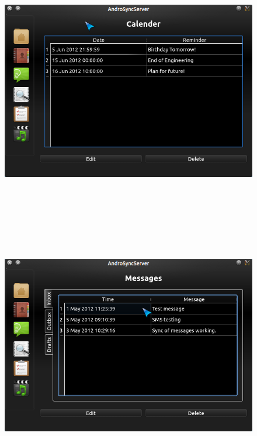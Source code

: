 \vspace{1cm}
\begin{figure}[H]
  \centering
    \includegraphics[height= 11cm, width=17cm]{project/images/AndroSyncServer/AndroSyncServer_Calender}
\end{figure}
\newpage
\begin{figure}[H]
  \centering
    \includegraphics[height= 11cm, width=17cm]{project/images/AndroSyncServer/AndroSyncServer_MsgInbox}
\end{figure}
\vspace{1cm}
